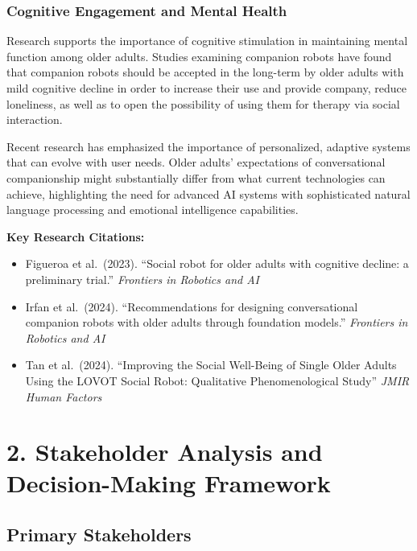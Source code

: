 \documentclass[
  letterpaper,
  DIV=11,
  numbers=noendperiod]{scrartcl}
\providecommand{\tightlist}{%
  \setlength{\itemsep}{0pt}\setlength{\parskip}{0pt}}\usepackage{longtable,booktabs,array}
\begin{document}
\subsubsection{Cognitive Engagement and Mental
Health}\label{cognitive-engagement-and-mental-health}

Research supports the importance of cognitive stimulation in maintaining
mental function among older adults. Studies examining companion robots
have found that companion robots should be accepted in the long-term by
older adults with mild cognitive decline in order to increase their use
and provide company, reduce loneliness, as well as to open the
possibility of using them for therapy via social interaction.

Recent research has emphasized the importance of personalized, adaptive
systems that can evolve with user needs. Older adults' expectations of
conversational companionship might substantially differ from what
current technologies can achieve, highlighting the need for advanced AI
systems with sophisticated natural language processing and emotional
intelligence capabilities.

\textbf{Key Research Citations:}

\begin{itemize}
\tightlist
\item
  Figueroa et al.~(2023). ``Social robot for older adults with cognitive
  decline: a preliminary trial.'' \emph{Frontiers in Robotics and AI}
\item
  Irfan et al.~(2024). ``Recommendations for designing conversational
  companion robots with older adults through foundation models.''
  \emph{Frontiers in Robotics and AI}
\item
  Tan et al.~(2024). ``Improving the Social Well-Being of Single Older
  Adults Using the LOVOT Social Robot: Qualitative Phenomenological
  Study'' \emph{JMIR Human Factors}
\end{itemize}

\section{2. Stakeholder Analysis and Decision-Making
Framework}\label{stakeholder-analysis-and-decision-making-framework}

\subsection{Primary Stakeholders}\label{primary-stakeholders}
\end{document}
